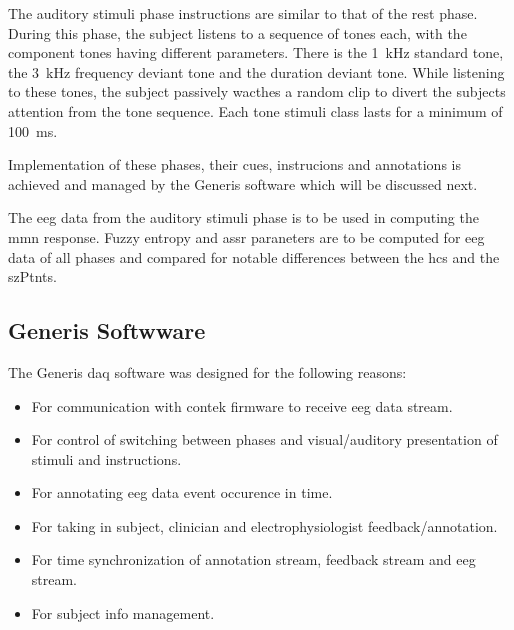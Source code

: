 \documentclass[10pt]{article}
\begin{document}
The auditory stimuli phase instructions are similar to that of the rest phase. During this phase, 
the subject listens to a sequence of tones each, with the component tones having different parameters. 
There is the \SI{1}{\kilo\hertz} standard tone, the \SI{3}{\kilo\hertz} frequency deviant tone and the 
duration deviant tone. While listening to these tones, the subject passively wacthes a random clip to 
divert the subjects attention from the tone sequence. Each tone stimuli class lasts for a minimum of 
\SI{100}{\milli\second}. 

Implementation of these phases, their cues, instrucions and annotations is achieved and managed by 
the Generis software which will be discussed next.

The \gls{eeg} data from the auditory stimuli phase is to be used in  computing the \gls{mmn} response.
Fuzzy entropy and \Gls{assr} paraneters are to be computed for \gls{eeg} data of all phases and compared 
for notable differences between the \glspl{hc} and the \glspl{szPtnt}.

\subsection{Generis Softwware}\label{ssec:Generis}
The Generis \gls{daq} software was designed for the following reasons:
\begin{itemize}
  \item For communication with contek firmware to receive \gls{eeg} data stream.
  \item For control of switching between phases and visual/auditory presentation of stimuli and instructions.
  \item For annotating \gls{eeg} data event occurence in time.
  \item For taking in subject, clinician and electrophysiologist feedback/annotation.
  \item For time synchronization of annotation stream, feedback stream and \gls{eeg} stream.
  \item For subject info management.
\end{itemize}
\end{document}
